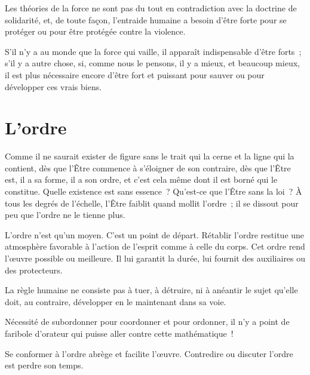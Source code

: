 \documentclass[french,twoside]{book} %
\newcommand{\astermono}{\medskip\centerline{\color{rubric}\large\selectfont{\syms ✻}}\medskip\par}%
\begin{document}
\astermono

\noindent Les théories de la force ne sont pas du tout en contradiction avec la doctrine de solidarité, et, de toute façon, l’entraide humaine a besoin d’être forte pour se protéger ou pour être protégée contre la violence.\par
S’il n’y a au monde que la force qui vaille, il apparaît indispensable d’être forts ; s’il y a autre chose, si, comme nous le pensons, il y a mieux, et beaucoup mieux, il est plus nécessaire encore d’être fort et puissant pour sauver ou pour développer ces vrais biens.
\section[{L’ordre}]{L’ordre}
\noindent Comme il ne saurait exister de figure sans le trait qui la cerne et la ligne qui la contient, dès que l’Être commence à s’éloigner de son contraire, dès que l’Être est, il a sa forme, il a son ordre, et c’est cela même dont il est borné qui le constitue. Quelle existence est sans essence ? Qu’est-ce que l’Être sans la loi ? À tous les degrés de l’échelle, l’Être faiblit quand mollit l’ordre ; il se dissout pour peu que l’ordre ne le tienne plus.\par

\astermono

\noindent L’ordre n’est qu’un moyen. C’est un point de départ. Rétablir l’ordre restitue une atmosphère favorable à l’action de l’esprit comme à celle du corps. Cet ordre rend l’œuvre possible ou meilleure. Il lui garantit la durée, lui fournit des auxiliaires ou des protecteurs.\par

\astermono

\noindent La règle humaine ne consiste pas à tuer, à détruire, ni à anéantir le sujet qu’elle doit, au contraire, développer en le maintenant dans sa voie.\par

\astermono

\noindent Nécessité de subordonner pour coordonner et pour ordonner, il n’y a point de faribole d’orateur qui puisse aller contre cette mathématique !\par

\astermono

\noindent Se conformer à l’ordre abrège et facilite l’œuvre. Contredire ou discuter l’ordre est perdre son temps.\par

\astermono
\end{document}
